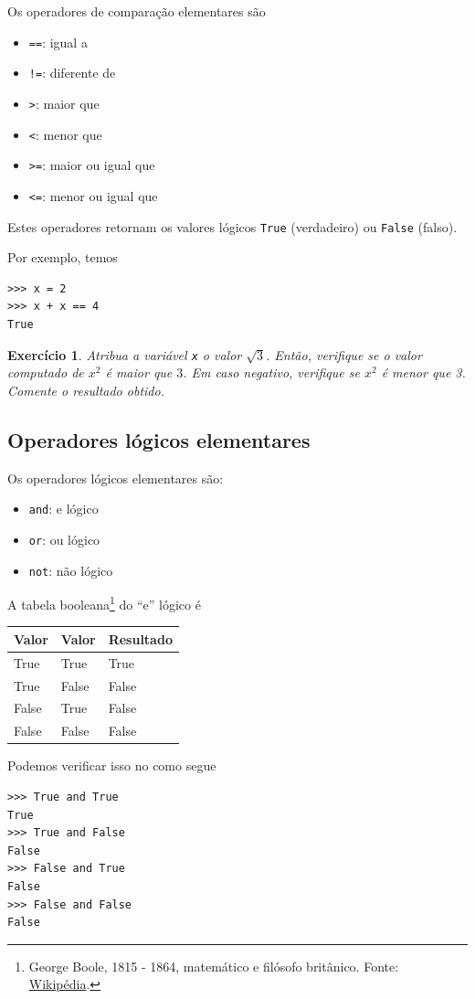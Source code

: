 \documentclass[12pt]{article}
\newtheorem{exr}{Exercício}[section]
\begin{document}
Os operadores de comparação elementares são
\begin{itemize}
\item[]\lstinline+==+: igual a
\item[]\lstinline+!=+: diferente de
\item[]\lstinline+>+: maior que
\item[]\lstinline+<+: menor que
\item[]\lstinline+>=+: maior ou igual que
\item[]\lstinline+<=+: menor ou igual que
\end{itemize}
Estes operadores retornam os valores lógicos \lstinline+True+ (verdadeiro) ou \lstinline+False+ (falso).

Por exemplo, temos
\begin{lstlisting}
>>> x = 2
>>> x + x == 4
True
\end{lstlisting}

\begin{exr}
  Atribua a variável \lstinline+x+ o valor $\sqrt{3}$. Então, verifique se o valor computado de $x^2$ é maior que $3$. Em caso negativo, verifique se $x^2$ é menor que 3. Comente o resultado obtido.
\end{exr}

\subsection{Operadores lógicos elementares}

Os operadores lógicos elementares são:
\begin{itemize}
\item[]\lstinline+and+: e lógico
\item[]\lstinline+or+: ou lógico
\item[]\lstinline+not+: não lógico
\end{itemize}

A tabela booleana\footnote{George Boole, 1815 - 1864, matemático e filósofo britânico. Fonte: \href{https://pt.wikipedia.org/wiki/George\_Boole}{Wikipédia}.} do ``e'' lógico é
\begin{center}
  \begin{tabular}[H]{ll|l}
    Valor & Valor & Resultado \\\hline
    True & True & True \\
    True & False & False \\
    False & True & False \\
    False & False & False \\\hline
  \end{tabular}
\end{center}
Podemos verificar isso no {\python} como segue
\begin{lstlisting}
>>> True and True
True
>>> True and False
False
>>> False and True
False
>>> False and False
False
\end{lstlisting}
\end{document}
